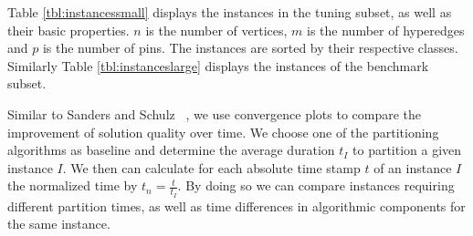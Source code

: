\documentclass[a4paper,12pt,titlepage, BCOR7mm,headsepline]{scrbook}
\numberwithin{equation}{section}
\begin{document}
Table \ref{tbl:instancessmall} displays the instances in the tuning subset, as well as their basic properties. $n$ is the number of vertices, $m$ is the number of hyperedges and $p$ is the number of pins. The instances are sorted by their respective classes. 
Similarly Table \ref{tbl:instanceslarge} displays the instances of the benchmark subset.
% 


Similar to Sanders and Schulz~\cite{sanders2012distributed}%
, we use convergence plots to compare the improvement of solution quality over time. We choose one of the partitioning algorithms as baseline and determine the average duration $t_I$ to partition a given instance $I$.
We then can calculate for each absolute time stamp $t$ of an instance $I$ the normalized time by $t_n = \frac{t}{t_I}$. By doing so we can %
compare instances requiring different partition times, as well as time differences in algorithmic components for the same instance.
\end{document}
